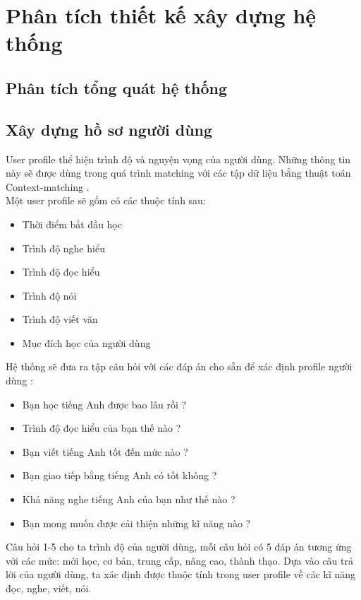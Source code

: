 
\chapter{Phân tích thiết kế xây dựng hệ thống} \label{design-analysis}

\section{Phân tích tổng quát hệ thống}



\section{Xây dựng hồ sơ người dùng}
User profile thể hiện trình độ và nguyện vọng của người dùng. Những thông tin này sẽ được dùng trong quá trình matching với các tập dữ liệu bằng thuật toán Context-matching . \\
Một user profile sẽ gồm có các thuộc tính sau:
\begin{itemize}
\item Thời điểm bắt đầu học
\item Trình độ nghe hiểu
\item Trình độ đọc hiểu
\item Trình độ nói
\item Trình độ viết văn
\item Mục đích học của người dùng\\
\end{itemize}
Hệ thống sẽ đưa ra tập câu hỏi với các đáp án cho sẵn để xác định profile người dùng :
\begin{itemize}
\item Bạn học tiếng Anh được bao lâu rồi ?
\item Trình độ đọc hiểu của bạn thế nào ?
\item Bạn viết tiếng Anh tốt đến mức nào ?
\item Bạn giao tiếp bằng tiếng Anh có tốt không ?
\item Khả năng nghe tiếng Anh của bạn như thế nào ?
\item Bạn mong muốn được cải thiện những kĩ năng nào ?	
\end{itemize}

Câu hỏi 1-5 cho ta trình độ của người dùng, mỗi câu hỏi có 5 đáp án tương ứng với các mức: mới học, cơ bản, trung cấp, nâng cao, thành thạo. Dựa vào câu trả lời của người dùng, ta xác định được thuộc tính trong user profile về các kĩ năng đọc, nghe, viết, nói.

